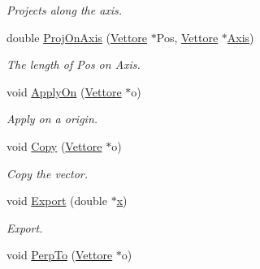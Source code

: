 \begin{DoxyCompactItemize}
\begin{DoxyCompactList}\small\item\em Projects along the axis. \end{DoxyCompactList}\item 
double \hyperlink{classVettore_a0521c48c381d2ddd16d4039c4d64a87b}{Proj\+On\+Axis} (\hyperlink{classVettore}{Vettore} $\ast$Pos, \hyperlink{classVettore}{Vettore} $\ast$\hyperlink{classVettore_a5a767accac3ff301f062fce739190bb8}{Axis})\hypertarget{classVettore_a0521c48c381d2ddd16d4039c4d64a87b}{}\label{classVettore_a0521c48c381d2ddd16d4039c4d64a87b}

\begin{DoxyCompactList}\small\item\em The length of Pos on Axis. \end{DoxyCompactList}\item 
void \hyperlink{classVettore_af4b317359ca70bbe6f41a178046d2e7f}{Apply\+On} (\hyperlink{classVettore}{Vettore} $\ast$o)\hypertarget{classVettore_af4b317359ca70bbe6f41a178046d2e7f}{}\label{classVettore_af4b317359ca70bbe6f41a178046d2e7f}

\begin{DoxyCompactList}\small\item\em Apply on a origin. \end{DoxyCompactList}\item 
void \hyperlink{classVettore_aed4e73920eb1f5d4d407c9913dd314f4}{Copy} (\hyperlink{classVettore}{Vettore} $\ast$o)\hypertarget{classVettore_aed4e73920eb1f5d4d407c9913dd314f4}{}\label{classVettore_aed4e73920eb1f5d4d407c9913dd314f4}

\begin{DoxyCompactList}\small\item\em Copy the vector. \end{DoxyCompactList}\item 
void \hyperlink{classVettore_a05beac72f2373cd7d3caa4ad8d3823be}{Export} (double $\ast$\hyperlink{classVettore_a711aad4cbe735871dd9e91ab575c878b}{x})\hypertarget{classVettore_a05beac72f2373cd7d3caa4ad8d3823be}{}\label{classVettore_a05beac72f2373cd7d3caa4ad8d3823be}

\begin{DoxyCompactList}\small\item\em Export. \end{DoxyCompactList}\item 
void \hyperlink{classVettore_ad289412e19e3a03ef86d329311712cff}{Perp\+To} (\hyperlink{classVettore}{Vettore} $\ast$o)\hypertarget{classVettore_ad289412e19e3a03ef86d329311712cff}{}\label{classVettore_ad289412e19e3a03ef86d329311712cff}


\end{DoxyCompactItemize}
